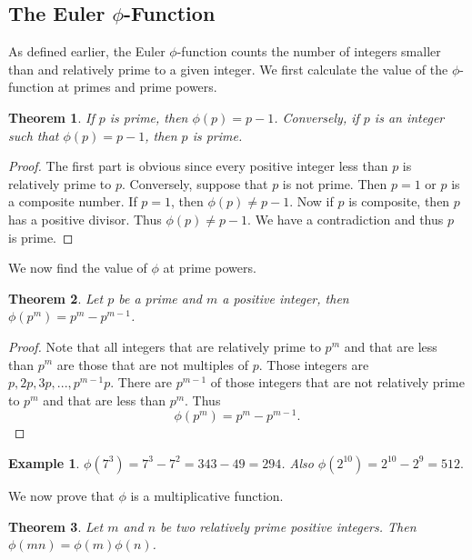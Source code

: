 \documentclass[12pt,letterpaper]{book}
\newtheorem{theorem}{Theorem}
\newtheorem{example}{Example}
\begin{document}
\subsection{\textbf{The Euler $\phi$-Function}}
As defined earlier, the Euler $\phi$-function counts the number of
integers smaller than and relatively prime to a given integer. We
first calculate the value of the $\phi$-function at primes and prime
powers.

\begin{theorem}
If $p$ is prime, then $\phi(p)=p-1$. Conversely, if $p$ is an
integer such that $\phi(p)=p-1$, then $p$ is prime.
\end{theorem}

\begin{proof}
The first part is obvious since every positive integer less than $p$
is relatively prime to $p$.  Conversely, suppose that $p$ is not
prime.  Then $p=1$ or $p$ is a composite number.  If $p=1$, then
$\phi(p)\neq p-1$.  Now if $p$ is composite, then $p$ has a positive
divisor.  Thus $\phi(p)\neq p-1$. We have a contradiction and thus
$p$ is prime.
\end{proof}

We now find the value of $\phi$ at prime powers.

\begin{theorem}\label{PhiPrime}
Let $p$ be a prime and $m$ a positive integer, then
$\phi(p^m)=p^m-p^{m-1}$.
\end{theorem}

\begin{proof}
Note that all integers that are relatively prime to $p^m$ and that
are less than $p^m$ are those that are not multiples of $p$. Those
integers are $p,2p,3p,...,p^{m-1}p$.  There are $p^{m-1}$ of those
integers that are not relatively prime to $p^m$ and that are less
than $p^m$.  Thus
\begin{equation*}
\phi(p^m)=p^m-p^{m-1}.
\end{equation*}
\end{proof}

\begin{example}
$\phi(7^3)=7^3-7^2=343-49=294$.  Also $\phi(2^{10})=2^{10}-2^9=512.$
\end{example}

We now prove that $\phi$ is a multiplicative function.

\begin{theorem}\label{PhiMult}
Let $m$ and $n$ be two relatively prime positive integers.  Then\\
$\phi(mn)=\phi(m)\phi(n)$.
\end{theorem}
\end{document}
